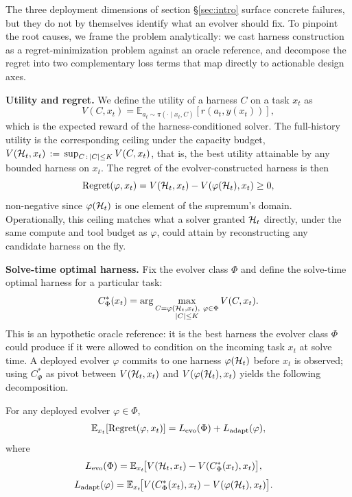 The three deployment dimensions of section \S\ref{sec:intro} surface concrete failures, but they do not by themselves identify what an evolver should fix. To pinpoint the root causes, we frame the problem analytically: we cast harness construction as a regret-minimization problem against an oracle reference, and decompose the regret into two complementary loss terms that map directly to actionable design axes.

\noindent\textbf{Utility and regret.}
We define the utility of a harness $C$ on a task $x_t$ as
\begin{equation}
\label{eq:utility}
V(C, x_t) = \mathbb{E}_{a_t \sim \pi(\cdot \mid x_t, C)}[r(a_t, y(x_t))],
\end{equation}
which is the expected reward of the harness-conditioned solver. The full-history utility is the corresponding ceiling under the capacity budget,
$V(\mathcal{H}_t, x_t) \,:=\, \sup_{\substack{C \,:\, |C| \leq K}} V(C, x_t)$,
that is, the best utility attainable by any bounded harness on $x_t$. The regret of the evolver-constructed harness is then
\begin{equation}
\label{eq:regret}
\text{Regret}(\varphi, x_t) = V(\mathcal{H}_t, x_t) - V(\varphi(\mathcal{H}_t), x_t) \geq 0,
\end{equation}
non-negative since $\varphi(\mathcal{H}_t)$ is one element of the supremum's domain. Operationally, this ceiling matches what a solver granted $\mathcal{H}_t$ directly, under the same compute and tool budget as $\varphi$, could attain by reconstructing any candidate harness on the fly.

\noindent\textbf{Solve-time optimal harness.}
Fix the evolver class $\Phi$ and define the solve-time optimal harness for a particular task:
\begin{equation}
\label{eq:cstar}
C^*_\Phi(x_t) = \arg\max_{\substack{C = \varphi(\mathcal{H}_t, x_t),\ \varphi \in \Phi \\ |C| \leq K}} V(C, x_t).
\end{equation}
This is an hypothetic oracle reference: it is the best harness the evolver class $\Phi$ could produce if it were allowed to condition on the incoming task $x_t$ at solve time. A deployed evolver $\varphi$ commits to one harness $\varphi(\mathcal{H}_t)$ before $x_t$ is observed; using $C^*_\Phi$ as pivot between $V(\mathcal{H}_t, x_t)$ and $V(\varphi(\mathcal{H}_t), x_t)$ yields the following decomposition.

\begin{proposition}
\label{prop:decomp}
For any deployed evolver $\varphi \in \Phi$,
\begin{equation}
\label{eq:decomp}
\mathbb{E}_{x_t}[\text{Regret}(\varphi, x_t)] = L_{\text{evo}}(\Phi) + L_{\text{adapt}}(\varphi),
\end{equation}
where
\begin{align}
\label{eq:losses}
L_{\text{evo}}(\Phi) &= \mathbb{E}_{x_t}\!\bigl[V(\mathcal{H}_t, x_t) - V(C^*_\Phi(x_t), x_t)\bigr],
\end{align}
\begin{align}
L_{\text{adapt}}(\varphi)  &= \mathbb{E}_{x_t}\!\bigl[V(C^*_\Phi(x_t), x_t) - V(\varphi(\mathcal{H}_t), x_t)\bigr].
\end{align}
\end{proposition}

